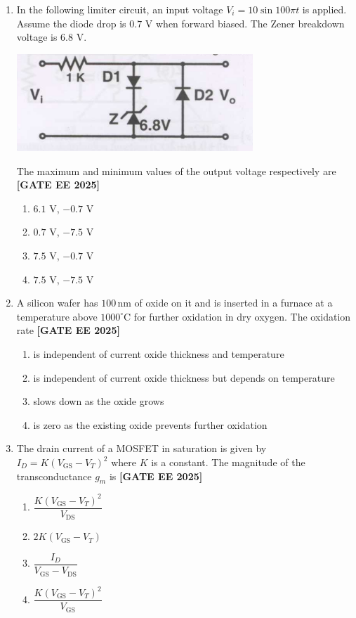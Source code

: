 \documentclass[12pt,a4paper]{article}
\begin{document}
\begin{enumerate}[leftmargin=2.5em, label=\textbf{Q.\arabic*}., itemsep=2em]
\item In the following limiter circuit, an input voltage $V_i=10\sin100\pi t$ is applied. Assume the diode drop is $0.7$ V when forward biased. The Zener breakdown voltage is $6.8$ V.
\begin{center}
\includegraphics[width=0.7\textwidth]{figs/q17.png}
\end{center}

The maximum and minimum values of the output voltage respectively are
\newline
\noindent \textbf{[GATE EE 2025]}
\begin{enumerate}[label=(\Alph*)]
  \item $6.1$ V, $-0.7$ V
  \item $0.7$ V, $-7.5$ V
  \item $7.5$ V, $-0.7$ V
  \item $7.5$ V, $-7.5$ V
\end{enumerate}

\item A silicon wafer has $100\,\mathrm{nm}$ of oxide on it and is inserted in a furnace at a temperature above $1000^\circ$C for further oxidation in dry oxygen. The oxidation rate
\newline
\noindent \textbf{[GATE EE 2025]}
\begin{enumerate}[label=(\Alph*)]
  \item is independent of current oxide thickness and temperature
  \item is independent of current oxide thickness but depends on temperature
  \item slows down as the oxide grows
  \item is zero as the existing oxide prevents further oxidation
\end{enumerate}

\item The drain current of a MOSFET in saturation is given by $I_D=K(V_{\mathrm{GS}}-V_T)^2$ where $K$ is a constant.
The magnitude of the transconductance $g_m$ is
\newline
\noindent \textbf{[GATE EE 2025]}
\begin{enumerate}[label=(\Alph*)]
  \item $\dfrac{K(V_{\mathrm{GS}}-V_T)^2}{V_{\mathrm{DS}}}$
  \item $2K(V_{\mathrm{GS}}-V_T)$
  \item $\dfrac{I_D}{V_{\mathrm{GS}}-V_{\mathrm{DS}}}$
  \item $\dfrac{K(V_{\mathrm{GS}}-V_T)^2}{V_{\mathrm{GS}}}$
\end{enumerate}


\end{enumerate}
\end{document}
